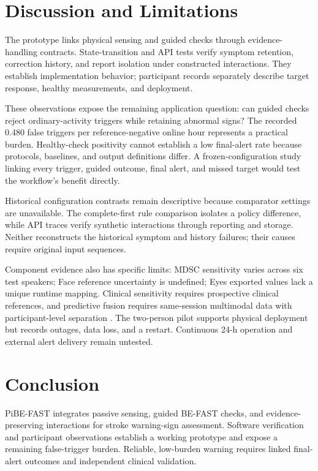 \section{Discussion and Limitations}
The prototype links physical sensing and guided checks through evidence-handling
contracts. State-transition and API tests verify symptom retention, correction
history, and report isolation under constructed interactions. They establish
implementation behavior; participant records separately describe target response,
healthy measurements, and deployment.

These observations expose the remaining application question: can guided checks
reject ordinary-activity triggers while retaining abnormal signs? The recorded
0.480 false triggers per reference-negative online hour represents a practical
burden. Healthy-check positivity cannot establish a low final-alert rate because
protocols, baselines, and output definitions differ. A frozen-configuration study
linking every trigger, guided outcome, final alert, and missed target would test
the workflow's benefit directly.

Historical configuration contrasts remain descriptive because comparator
settings are unavailable. The complete-first rule comparison isolates a policy
difference, while API traces verify synthetic interactions through reporting and
storage. Neither reconstructs the historical symptom and history failures;
their causes require original input sequences.

Component evidence also has specific limits: MDSC sensitivity varies across six
test speakers; Face reference uncertainty is undefined; Eyes exported values lack
a unique runtime mapping. Clinical sensitivity requires prospective clinical
references, and predictive fusion requires same-session multimodal data with
participant-level separation \cite{collins2024tripodai}. The two-person pilot
supports physical deployment but records outages, data loss, and a restart.
Continuous 24-h operation and external alert delivery remain untested.

\section{Conclusion}
PiBE-FAST integrates passive sensing, guided BE-FAST checks, and evidence-preserving
interactions for stroke warning-sign assessment. Software verification and
participant observations establish a working prototype and expose a remaining
false-trigger burden. Reliable, low-burden warning requires linked final-alert
outcomes and independent clinical validation.
